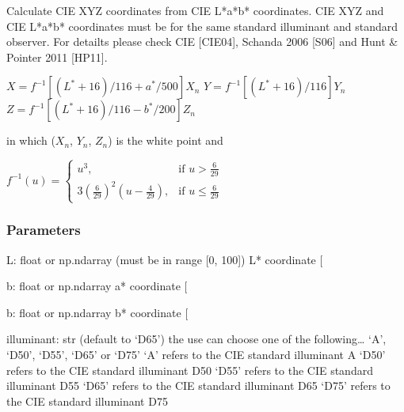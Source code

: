 \documentclass[letterpaper,10pt,english]{sphinxmanual}
\begin{document}

\begin{fulllineitems}
\label{\detokenize{07_colors:skinoptics.colors.XYZ_from_Lab}}
\pysigstartsignatures
{}
\pysigstopsignatures
\sphinxAtStartPar
Calculate CIE XYZ coordinates from CIE L*a*b* coordinates.
CIE XYZ and CIE L*a*b* coordinates must be for the same standard illuminant and standard observer.
For detailts please check CIE {[}CIE04{]}, Schanda 2006 {[}S06{]} and Hunt \& Pointer 2011 {[}HP11{]}.

\sphinxAtStartPar
\(X = f^{-1}[(L^* + 16)/116 + a^*/500]X_n\)
\(Y = f^{-1}[(L^* + 16)/116]Y_n\)
\(Z = f^{-1}[(L^* + 16)/116 - b^*/200]Z_n\)

\sphinxAtStartPar
in which (\(X_n\), \(Y_n\), \(Z_n\)) is the white point and

\sphinxAtStartPar
\(f^{-1}(u) = \left\{ 
\begin{matrix}
u^3, & \mbox{if }  u > \frac{6}{29} \\
3\left(\frac{6}{29}\right)^2\left(u - \frac{4}{29} \right), & \mbox{if } u \le \frac{6}{29}
\end{matrix}\right.\)


\subsubsection{Parameters}
\label{\detokenize{07_colors:id17}}
\sphinxAtStartPar
L: float or np.ndarray (must be in range {[}0, 100{]})
L* coordinate {[}\sphinxhyphen{}{]}

\sphinxAtStartPar
b: float or np.ndarray
a* coordinate {[}\sphinxhyphen{}{]}

\sphinxAtStartPar
b: float or np.ndarray
b* coordinate {[}\sphinxhyphen{}{]}

\sphinxAtStartPar
illuminant: str (default to ‘D65’)
the use can choose one of the following… ‘A’, ‘D50’, ‘D55’, ‘D65’ or ‘D75’
‘A’ refers to the CIE standard illuminant A
‘D50’ refers to the CIE standard illuminant D50
‘D55’ refers to the CIE standard illuminant D55
‘D65’ refers to the CIE standard illuminant D65
‘D75’ refers to the CIE standard illuminant D75


\end{fulllineitems}
\end{document}
